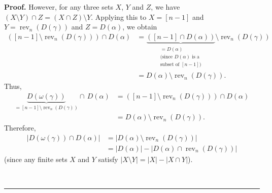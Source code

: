 \documentclass[numbers=enddot,12pt,final,onecolumn,notitlepage]{scrartcl}%
\theoremstyle{definition}
\newenvironment{proof}[1][Proof]{\noindent\textbf{#1.} }{\ \rule{0.5em}{0.5em}}
\begin{document}
\begin{proof}
However, for any three sets $X$, $Y$ and $Z$, we have $\left(  X\setminus
Y\right)  \cap Z=\left(  X\cap Z\right)  \setminus Y$. Applying this to
$X=\left[  n-1\right]  $ and $Y=\operatorname*{rev}\nolimits_{n}\left(
D\left(  \gamma\right)  \right)  $ and $Z=D\left(  \alpha\right)  $, we obtain%
\begin{align*}
\left(  \left[  n-1\right]  \setminus\operatorname*{rev}\nolimits_{n}\left(
D\left(  \gamma\right)  \right)  \right)  \cap D\left(  \alpha\right)   &
=\underbrace{\left(  \left[  n-1\right]  \cap D\left(  \alpha\right)  \right)
}_{\substack{=D\left(  \alpha\right)  \\\text{(since }D\left(  \alpha\right)
\text{ is a}\\\text{subset of }\left[  n-1\right]  \text{)}}}\setminus
\operatorname*{rev}\nolimits_{n}\left(  D\left(  \gamma\right)  \right) \\
&  =D\left(  \alpha\right)  \setminus\operatorname*{rev}\nolimits_{n}\left(
D\left(  \gamma\right)  \right)  .
\end{align*}
Thus,%
\begin{align*}
\underbrace{D\left(  \omega\left(  \gamma\right)  \right)  }_{=\left[
n-1\right]  \setminus\operatorname*{rev}\nolimits_{n}\left(  D\left(
\gamma\right)  \right)  }\cap\,D\left(  \alpha\right)   &  =\left(  \left[
n-1\right]  \setminus\operatorname*{rev}\nolimits_{n}\left(  D\left(
\gamma\right)  \right)  \right)  \cap D\left(  \alpha\right) \\
&  =D\left(  \alpha\right)  \setminus\operatorname*{rev}\nolimits_{n}\left(
D\left(  \gamma\right)  \right)  .
\end{align*}
Therefore,%
\begin{align}
\left\vert D\left(  \omega\left(  \gamma\right)  \right)  \cap D\left(
\alpha\right)  \right\vert  &  =\left\vert D\left(  \alpha\right)
\setminus\operatorname*{rev}\nolimits_{n}\left(  D\left(  \gamma\right)
\right)  \right\vert \nonumber\\
&  =\left\vert D\left(  \alpha\right)  \right\vert -\left\vert D\left(
\alpha\right)  \cap\operatorname*{rev}\nolimits_{n}\left(  D\left(
\gamma\right)  \right)  \right\vert \label{pf.prop.eta.S.O1.3}%
\end{align}
(since any finite sets $X$ and $Y$ satisfy $\left\vert X\setminus Y\right\vert
=\left\vert X\right\vert -\left\vert X\cap Y\right\vert $).


\end{proof}
\end{document}
